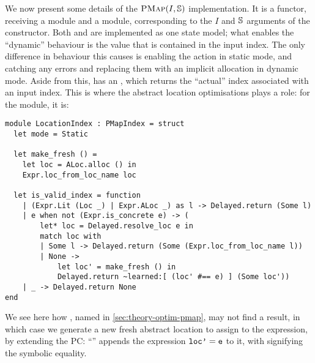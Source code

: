 We now present some details of the $\textsc{PMap}(I,\mathbb S)$ implementation. It is a functor, receiving a  module and a  module, corresponding to the $I$ and $\mathbb S$ arguments of the constructor. Both \PMap{} and \DynPMap{} are implemented as one state model; what enables the ``dynamic'' behaviour is the value  that is contained in the input index. The only difference in behaviour this causes is enabling the \alloc{} action in static mode, and catching any  errors and replacing them with an implicit allocation in dynamic mode. Aside from this,  has an , which returns the ``actual'' index associated with an input index. This is where the abstract location optimisations plays a role: for the  module, it is: \begin{lstlisting}
module LocationIndex : PMapIndex = struct
  let mode = Static

  let make_fresh () =
    let loc = ALoc.alloc () in
    Expr.loc_from_loc_name loc

  let is_valid_index = function
    | (Expr.Lit (Loc _) | Expr.ALoc _) as l -> Delayed.return (Some l)
    | e when not (Expr.is_concrete e) -> (
        let* loc = Delayed.resolve_loc e in
        match loc with
        | Some l -> Delayed.return (Some (Expr.loc_from_loc_name l))
        | None ->
            let loc' = make_fresh () in
            Delayed.return ~learned:[ (loc' #== e) ] (Some loc'))
    | _ -> Delayed.return None
end
\end{lstlisting}
We see here how , named  in \cref{sec:theory-optim-pmap}, may not find a result, in which case we generate a new fresh abstract location to assign to the expression, by extending the PC: ``'' appends the expression $\texttt{loc'} = \texttt{e}$ to it, with \code{\#==} signifying the symbolic equality.

